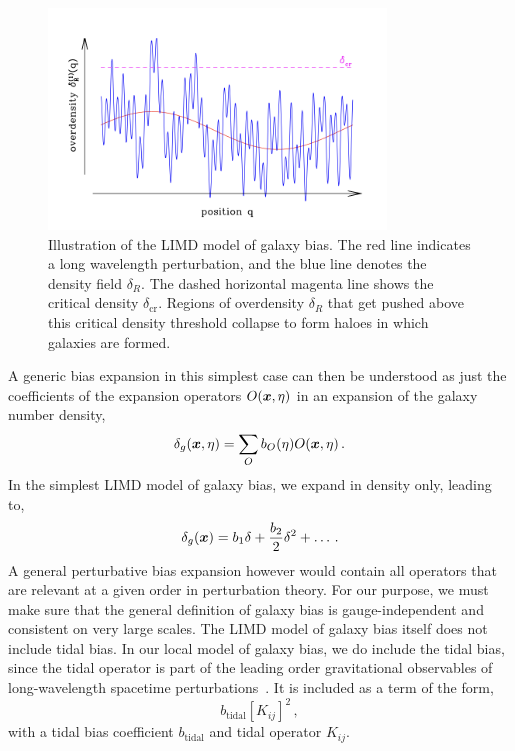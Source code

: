 \begin{figure}[!ht]
	\centering
	\includegraphics[width=0.8\textwidth]{fig/limdcartoon.png}
	\caption{Illustration of the LIMD model of galaxy bias. The red line indicates a long wavelength perturbation, and the blue line denotes the density field $\delta_R$. The dashed horizontal magenta line shows the critical density $\delta_{\mathrm{cr}}$. Regions of overdensity $\delta_R$ that get pushed above this critical density threshold collapse to form haloes in which galaxies are formed.}
	\label{fig:limdcartoon}
\end{figure}
A generic bias expansion in this simplest case can then be understood as just the coefficients of the expansion operators $O(\bm {x},\eta)$ in an expansion of the galaxy number density, 
\begin{equation}
	\delta_g(\bm {x},\eta) = \sum_O b_O(\eta) O(\bm {x},\eta)\,.
\end{equation}
In the simplest LIMD model of galaxy bias, we expand in density only, leading to, 
\begin{equation}
	\delta_g(\bm {x}) = b_1 \delta + \frac{b_2}{2} \delta^2 + \ldots\,.
\end{equation}
A general perturbative bias expansion however would contain all operators that are relevant at a given order in perturbation theory. For our purpose, we must make sure that the general definition of galaxy bias is gauge-independent and consistent on very large scales. The LIMD model of galaxy bias itself does not include tidal bias. In our local model of galaxy bias, we do include the tidal bias, since the tidal operator is part of the leading order gravitational observables of long-wavelength spacetime perturbations~\cite{Desjacques:2016bnm}. It is included as a term of the form, 
\begin{equation}
 	b_{\mathrm{tidal}} \left[ K_{ij} \right]^2\,,
\end{equation} 
with a tidal bias coefficient $b_{\mathrm{tidal}}$ and tidal operator $K_{ij}$.

